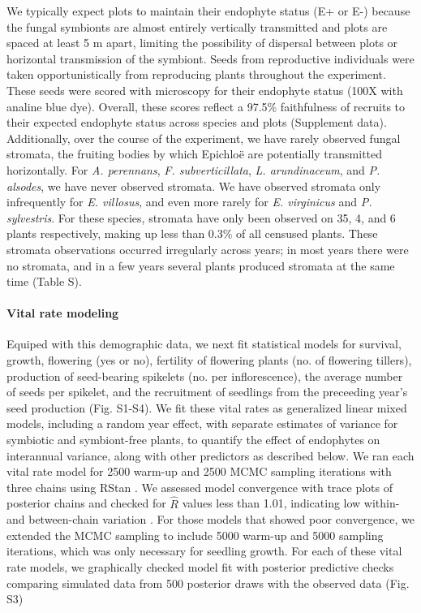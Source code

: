\documentclass[12pt]{article}
\begin{document}
We typically expect plots to maintain their endophyte status (E+ or E-) because the fungal symbionts are almost entirely vertically transmitted and plots are {\color{red}spaced at least 5 m apart}, limiting the possibility of dispersal between plots or horizontal transmission of the symbiont. 
Seeds from reproductive individuals were taken opportunistically from reproducing plants throughout the experiment. 
These seeds were scored with microscopy for their endophyte status  (100X with analine blue dye).  
Overall, these scores reflect a 97.5\% faithfulness of recruits to their expected endophyte status across species and plots (Supplement data). 
Additionally, over the course of the experiment, we have rarely observed fungal stromata, the fruiting bodies by which Epichlo\"e are potentially transmitted horizontally. 
For \emph{A. perennans}, \emph{F. subverticillata}, \emph{L. arundinaceum}, and \emph{P. alsodes}, we have never observed stromata. 
We have observed stromata only infrequently for \emph{E. villosus}, and even more rarely for \emph{E. virginicus} and \emph{P. sylvestris}. 
For these species, stromata have only been observed on 35, 4, and 6 plants respectively, making up less than 0.3\% of all censused plants.
These stromata observations occurred irregularly across years; in most years there were no stromata, and in a few years several plants produced stromata at the same time (Table S). 

\paragraph*{Vital rate modeling}
Equiped with this demographic data, we next fit statistical models for survival, growth, flowering (yes or no), fertility of flowering plants (no. of flowering tillers),  production of seed-bearing spikelets (no. per inflorescence), the average number of seeds per spikelet, and the recruitment of seedlings from the preceeding year's seed production (Fig. S1-S4).  
We fit these vital rates as generalized linear mixed models, including a random year effect, with separate estimates of variance for symbiotic and symbiont-free plants, to quantify the effect of endophytes on interannual variance, along with other predictors as described below.
We ran each vital rate model for 2500 warm-up and 2500 MCMC sampling iterations with three chains using RStan \cite{rstan2022}. 
We assessed model convergence with trace plots of posterior chains and checked for $\hat{R}$ values less than 1.01, indicating low within- and between-chain variation \cite{brooks1998general,gelman2006data}. 
For those models that showed poor convergence, we extended the MCMC sampling to include 5000 warm-up and 5000 sampling iterations, which was only necessary for seedling growth. 
For each of these vital rate models, we graphically checked model fit with posterior predictive checks comparing simulated data from 500 posterior draws with the observed data (Fig. S3)
\end{document}
